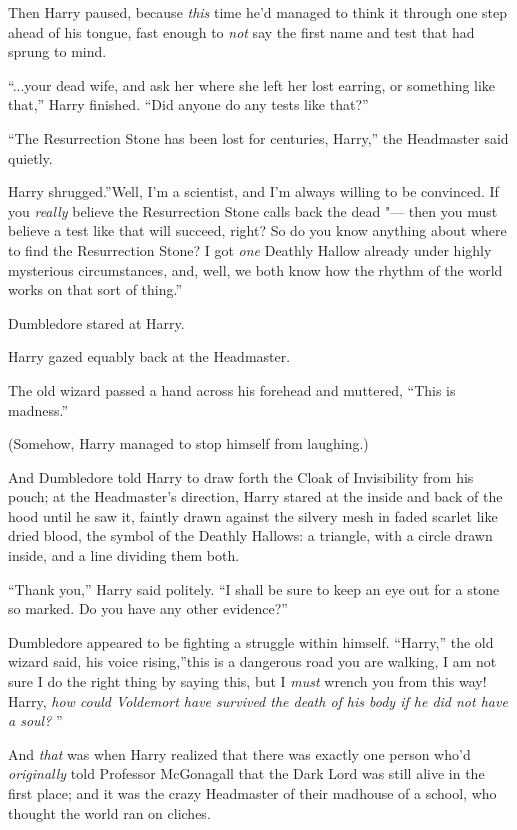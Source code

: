 Then Harry paused, because \emph{this} time he'd managed to think it
through one step ahead of his tongue, fast enough to \emph{not} say the
first name and test that had sprung to mind.

``...your dead wife, and ask her where she left her lost earring,
or something like that,'' Harry finished. ``Did anyone do any tests like
that?''

``The Resurrection Stone has been lost for centuries, Harry,'' the
Headmaster said quietly.

Harry shrugged.''Well, I'm a scientist, and I'm always willing to be
convinced. If you \emph{really} believe the Resurrection Stone calls
back the dead "--- then you must believe a test like that will succeed,
right? So do you know anything about where to find the Resurrection
Stone? I got \emph{one} Deathly Hallow already under highly mysterious
circumstances, and, well, we both know how the rhythm of the world works
on that sort of thing.''

Dumbledore stared at Harry.

Harry gazed equably back at the Headmaster.

The old wizard passed a hand across his forehead and muttered, ``This is
madness.''

(Somehow, Harry managed to stop himself from laughing.)

And Dumbledore told Harry to draw forth the Cloak of Invisibility from
his pouch; at the Headmaster's direction, Harry stared at the inside and
back of the hood until he saw it, faintly drawn against the silvery mesh
in faded scarlet like dried blood, the symbol of the Deathly Hallows: a
triangle, with a circle drawn inside, and a line dividing them both.

``Thank you,'' Harry said politely. ``I shall be sure to keep an eye out
for a stone so marked. Do you have any other evidence?''

Dumbledore appeared to be fighting a struggle within himself. ``Harry,''
the old wizard said, his voice rising,''this is a dangerous road you are
walking, I am not sure I do the right thing by saying this, but I
\emph{must} wrench you from this way! Harry, \emph{how could Voldemort
have survived the death of his body if he did not have a soul?} ''

And \emph{that} was when Harry realized that there was exactly one
person who'd \emph{originally} told Professor McGonagall that the Dark
Lord was still alive in the first place; and it was the crazy Headmaster
of their madhouse of a school, who thought the world ran on cliches.

